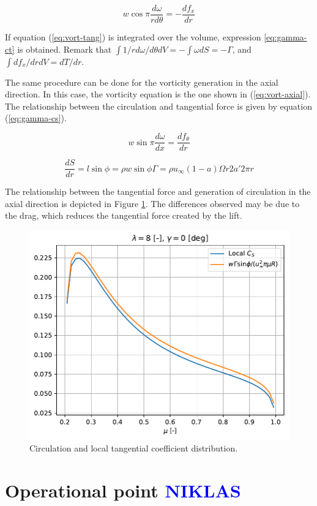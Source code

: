 \begin{equation}
	w \cos \pi \frac{d\omega}{rd\theta} = - \frac{df_x}{dr}
	\label{eq:vort-tang}
\end{equation}

If equation (\ref{eq:vort-tang}) is integrated over the volume, expression \ref{eq:gamma-ct} is obtained. Remark that $ \int 1/r d\omega/d\theta dV = - \int \omega dS = - \Gamma $, and $ \int df_x/dr dV = dT/dr $.

The same procedure can be done for the vorticity generation in the axial direction. In this case, the vorticity equation is the one shown in (\ref{eq:vort-axial}). The relationship between the circulation and tangential force is given by equation (\ref{eq:gamma-cs}).

\begin{equation}
	w \sin \pi \frac{d\omega}{dx} = \frac{df_{\theta}}{dr}
	\label{eq:vort-axial}
\end{equation}

\begin{equation}
	\frac{dS}{dr} = l \sin \phi = \rho w \sin \phi \Gamma = \rho u_{\infty} (1-a) \Omega r 2a' 2 \pi r
	\label{eq:gamma-cs}
\end{equation}

The relationship between the tangential force and generation of circulation in the axial direction is depicted in Figure \ref{img:vort-forces-ax}. The differences observed may be due to the drag, which reduces the tangential force created by the lift.

\begin{figure}[htbp]
	\centering
	\includegraphics[height=0.45\textheight]{./img/circulation/vort-forces-ax.pdf}
	\caption{Circulation and local tangential coefficient distribution.}
	\label{img:vort-forces-ax}
\end{figure}

\section{Operational point \textcolor{blue}{NIKLAS}}
